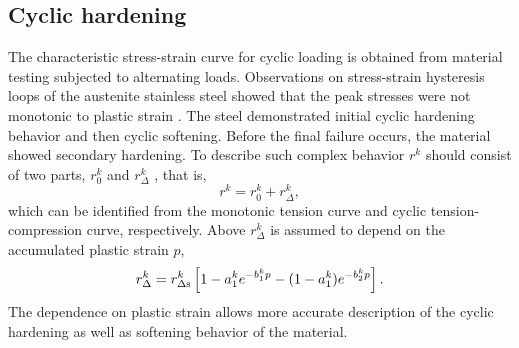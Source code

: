 \documentclass[preprint,5p,twocolumn,11pt,sort&compress]{elsarticle}
\begin{document}
\subsection{Cyclic hardening}
\noindent
The characteristic stress-strain curve for cyclic loading is obtained from material testing subjected to alternating loads. Observations on stress-strain hysteresis loops of the austenite stainless steel showed that the peak stresses were not monotonic to plastic strain \cite{fang2015cyclic}. The steel demonstrated initial cyclic hardening behavior and then cyclic softening. Before the final failure occurs, the material showed secondary hardening. To describe such complex behavior $r^k$ should consist of two parts, $r_0^k$ and $r_{\Delta}^k$  \cite{fang2015cyclic}, that is,
\begin{equation}
\label{Equ:rk1}
{r^k} = r_0^k + r_\Delta ^k,
\end{equation}
which can be identified from the monotonic tension curve and cyclic tension-compression curve, respectively.
Above $r_\Delta ^k$ is assumed to depend on the accumulated plastic strain $p$,
\begin{equation}
r_\Delta ^k = r_{\Delta \rm s}^k\left[ {1 - a_1^k{e^{ - b_1^kp}} - (1-a_1^k){e^{ - b_2^kp}} }\right].
\label{Equ:rdeltak}
\end{equation}
The dependence on plastic strain allows more accurate description of the cyclic hardening as well as softening behavior of the material.
\end{document}
